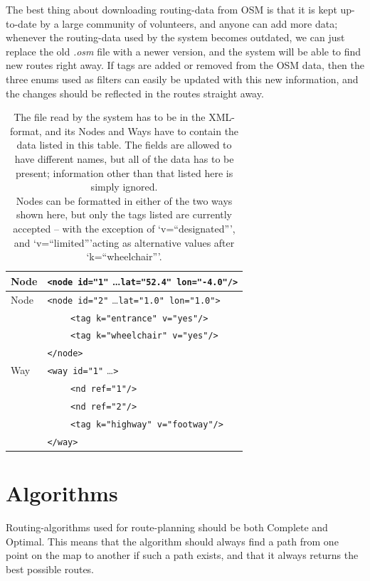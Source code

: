 The best thing about downloading routing-data from OSM is that it is kept up-to-date by a large community of volunteers, and anyone can add more data; whenever the routing-data used by the system becomes outdated, we can just replace the old \textit{.osm} file with a newer version, and the system will be able to find new routes right away. If tags are added or removed from the OSM data, then the three enums used as filters can easily be updated with this new information, and the changes should be reflected in the routes straight away.

\begin{table}[hb]
	\begin{tabular}{| l | l |}
		\hline
		Node & \verb|<node id="1"| \dots \verb|lat="52.4" lon="-4.0"/>|  \\
		\hline
		\hline
		Node & \verb|<node id="2"| \dots \verb|lat="1.0" lon="1.0">|\\
			& ~~~~ \verb|<tag k="entrance" v="yes"/>|\\
			& ~~~~ \verb|<tag k="wheelchair" v="yes"/>|\\
		& \verb|</node>|\\
		\hline\hline
		Way & \verb|<way id="1"| \dots \verb|>|\\
			& ~~~~ \verb|<nd ref="1"/>|\\
			& ~~~~ \verb|<nd ref="2"/>|\\
			& ~~~~ \verb|<tag k="highway" v="footway"/>|\\
		& \verb|</way>|\\
		\hline
	\end{tabular}
	\caption[Structure of \textit{.osm} file]{The file read by the system has to be in the XML-format, and its Nodes and Ways have to contain the data listed in this table. The fields are allowed to have different names, but all of the data has to be present; information other than that listed here is simply ignored.\\Nodes can be formatted in either of the two ways shown here, but only the tags listed are currently accepted -- with the exception of \textquoteleft v=\textquotedblleft designated\textquotedblright\textquoteright, and \textquoteleft v=\textquotedblleft limited\textquotedblright\textquoteright acting as alternative values after \textquoteleft k=\textquotedblleft wheelchair\textquotedblright\textquoteright.}
	\label{tab:nodeWayLables}
\end{table}

\newpage
\section{Algorithms}
Routing-algorithms used for route-planning should be both Complete and Optimal. This means that the algorithm should always find a path from one point on the map to another if such a path exists, and that it always returns the best possible routes.

